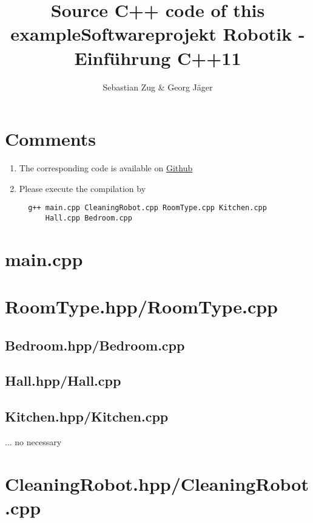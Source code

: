 \documentclass{article}
\begin{document}
\title{Source C++ code of this example\newline Softwareprojekt Robotik - Einf\"uhrung C++11}
\author{Sebastian Zug \& Georg J\"ager}
\maketitle

\section{Comments }

\begin{enumerate}
  \item The corresponding code is available on \href{https://github.com/SebastianZug/SoftwareprojektRobotik/tree/master/examples/05_DesginPattern}{Github}
  \item Please execute the compilation by

  \begin{verbatim}
  g++ main.cpp CleaningRobot.cpp RoomType.cpp Kitchen.cpp
      Hall.cpp Bedroom.cpp
  \end{verbatim}

\end{enumerate}

\section{main.cpp}



\section{RoomType.hpp/RoomType.cpp}




\subsection{Bedroom.hpp/Bedroom.cpp}




\subsection{Hall.hpp/Hall.cpp}




\subsection{Kitchen.hpp/Kitchen.cpp}
... no necessary

\section{CleaningRobot.hpp/CleaningRobot.cpp}



\end{document}
